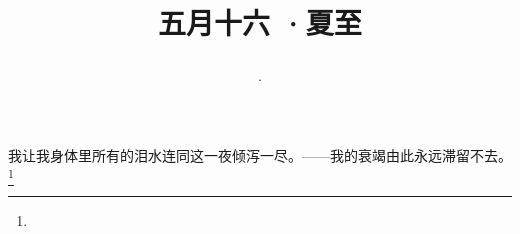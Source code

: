 \title{\date[d=21,m=6,y=2024][year:cn-y,年,month:cn,day:cn,日,·,weekday]·五月十六 ·夏至}
我让我身体里所有的泪水连同这一夜倾泻一尽。——我的衰竭由此永远滞留不去。\footnote{ }

